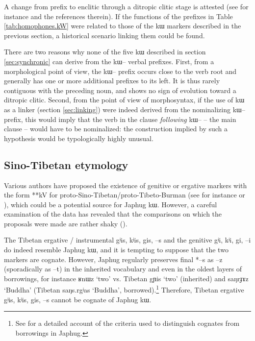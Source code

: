 \documentclass[oldfontcommands,oneside,a4paper,11pt]{article}
\newcommand{\ipa}[1]{{\phon #1}} %
\begin{document}
A change from prefix to enclitic through a ditropic clitic stage is attested (see for instance  \citet{himmelmann14asymmetries} and the references therein). If the functions of the prefixes in Table \ref{tab:homophones.kW} were related to those of the \ipa{kɯ} markers described in the previous section, a historical scenario linking them could be found. 

 There are two reasons why none of the five \ipa{kɯ} described in section \ref{sec:synchronic} can derive from the \ipa{kɯ--} verbal prefixes. First, from a morphological point of view, the \ipa{kɯ--} prefix occurs close to the verb root and generally has one or more additional prefixes to its left. It is thus rarely contiguous with the preceding noun, and shows no sign of evolution toward a ditropic clitic. Second, from the point of view of morphosyntax, if the use of \ipa{kɯ} as a linker (section \ref{sec:linking}) were indeed derived from the nominalizing \ipa{kɯ--} prefix, this would imply that the verb in the clause \textit{following} \ipa{kɯ--} -- the main clause -- would have to be nominalized: the construction implied by such a hypothesis would be typologically highly unusual.

 

\subsection{Sino-Tibetan etymology}
Various authors have proposed the existence of genitive or ergative markers with the form **\ipa{kV} for proto-Sino-Tibetan/proto-Tibeto-Burman (see for instance \citealt[95-6]{benedict72} or \citealt{delancey84case}), which could be a potential source for Japhug \ipa{kɯ}. However, a careful examination of the data has revealed that the comparisons on which the proposals were made are rather shaky (\citealt{lapolla95ergative}).

The Tibetan ergative / instrumental \ipa{gʲis, kʲis, gis, --s} and the genitive \ipa{gʲi, kʲi, gi, --i} do indeed resemble Japhug \ipa{kɯ}, and it is tempting to suppose that the two markers are cognate. However, Japhug regularly preserves final *\ipa{--s} as \ipa{--z} (sporadically as \ipa{--t}) in the inherited vocabulary and even in the oldest layers of borrowings, for instance \ipa{ʁnɯz} `two'  vs. Tibetan \ipa{gɲis} `two' (inherited) and \ipa{saŋrɟɤz} `Buddha' (Tibetan \ipa{saŋs.rgʲas} `Buddha', borrowed).\footnote{See \citet[83-200]{jacques04these} for a detailed account of the criteria used to distinguish cognates from borrowings in Japhug.} Therefore, Tibetan ergative \ipa{gʲis, kʲis, gis, --s} cannot be cognate of Japhug \ipa{kɯ}.
\end{document}
